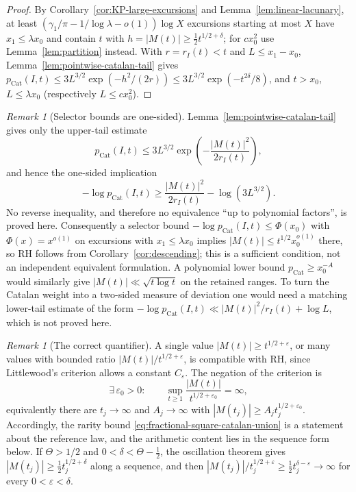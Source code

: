 \documentclass[11pt]{amsart}
\numberwithin{equation}{section}
\theoremstyle{plain}
\theoremstyle{definition}
\theoremstyle{remark}
\newtheorem{remark}[theorem]{Remark}
\newcommand{\eps}{\varepsilon}
\begin{document}
\begin{proof}
By Corollary~\ref{cor:KP-large-excursions} and Lemma~\ref{lem:linear-lacunary},
at least $(\gamma_1/\pi-1/\log\lambda-o(1))\log X$ excursions starting at
most $X$ have $x_1\le\lambda x_0$ and contain $t$ with
$h=|M(t)|\ge\frac12t^{1/2+\delta}$; for $cx_0^2$ use
Lemma~\ref{lem:partition} instead. With $r=r_I(t)<t$ and $L\le x_1-x_0$,
Lemma~\ref{lem:pointwise-catalan-tail} gives
$p_{\mathrm{Cat}}(I,t)\le3L^{3/2}\exp(-h^2/(2r))\le3L^{3/2}\exp(-t^{2\delta}/8)$,
and $t>x_0$, $L\le\lambda x_0$ (respectively $L\le cx_0^2$).
\end{proof}

\begin{remark}[Selector bounds are one-sided]
\label{rem:catalan-selector-gap}
Lemma~\ref{lem:pointwise-catalan-tail} gives only the upper-tail estimate
\[
 p_{\mathrm{Cat}}(I,t)
 \le 3L^{3/2}\exp\!\left(-\frac{|M(t)|^2}{2r_I(t)}\right),
\]
and hence the one-sided implication
\[
 -\log p_{\mathrm{Cat}}(I,t)
 \ge \frac{|M(t)|^2}{2r_I(t)}-\log(3L^{3/2}).
\]
No reverse inequality, and therefore no equivalence ``up to polynomial
factors'', is proved here.  Consequently a selector bound
$-\log p_{\mathrm{Cat}}(I,t)\le\Phi(x_0)$ with
$\Phi(x)=x^{o(1)}$ on excursions with $x_1\le\lambda x_0$ implies
$|M(t)|\le t^{1/2}x_0^{o(1)}$ there, so RH follows from
Corollary~\ref{cor:descending}; this is a sufficient condition, not an
independent equivalent formulation.  A polynomial lower bound
$p_{\mathrm{Cat}}\ge x_0^{-A}$ would similarly give
$|M(t)|\ll\sqrt{t\log t}$ on the retained ranges.  To turn the Catalan
weight into a two-sided measure of deviation one would need a matching
lower-tail estimate of the form
$-\log p_{\mathrm{Cat}}(I,t)\ll |M(t)|^2/r_I(t)+\log L$, which is not proved
here.
\end{remark}

\begin{remark}[The correct quantifier]
\label{rem:quantifier}
A single value $|M(t)|\ge t^{1/2+\eps}$, or many values with bounded ratio
$|M(t)|/t^{1/2+\eps}$, is compatible with RH, since Littlewood's criterion
allows a constant $C_\eps$. The negation of the criterion is
\[
\exists\,\eps_0>0:\qquad
\sup_{t\ge1}\frac{|M(t)|}{t^{1/2+\eps_0}}=\infty,
\]
equivalently there are $t_j\to\infty$ and $A_j\to\infty$ with
$|M(t_j)|\ge A_jt_j^{1/2+\eps_0}$. Accordingly, the rarity bound
\eqref{eq:fractional-square-catalan-union} is a statement about the
reference law, and the arithmetic content lies in the sequence form
below. If $\Theta>1/2$ and $0<\delta<\Theta-\frac12$, the oscillation
theorem gives $|M(t_j)|\ge\frac12t_j^{1/2+\delta}$ along a sequence, and then
$|M(t_j)|/t_j^{1/2+\eps}\ge\frac12t_j^{\delta-\eps}\to\infty$ for every
$0<\eps<\delta$.
\end{remark}
\end{document}

